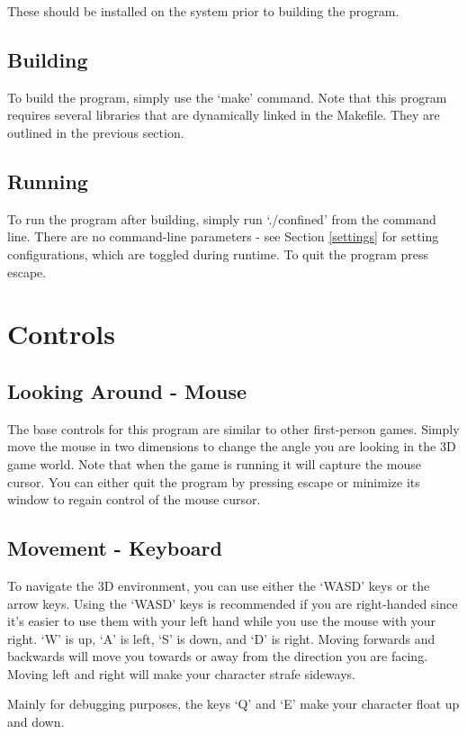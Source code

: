 \documentclass{book}
\begin{document}
      These should be installed on the system prior to building the program.

    \subsection{Building}
      To build the program, simply use the `make' command.
      Note that this program requires several libraries that are dynamically linked in the Makefile. They are outlined in the previous section.

    \subsection{Running}
      To run the program after building, simply run `./confined' from the command line.
      There are no command-line parameters - see Section \ref{settings} for setting configurations, which are toggled during runtime.
      To quit the program press escape.

  \section{Controls}
    \subsection{Looking Around - Mouse}
      The base controls for this program are similar to other first-person games.
      Simply move the mouse in two dimensions to change the angle you are looking in the 3D game world.
      Note that when the game is running it will capture the mouse cursor. You can either quit the program by pressing escape or minimize its window to regain control of the mouse cursor.

    \subsection{Movement - Keyboard}
      To navigate the 3D environment, you can use either the `WASD' keys or the arrow keys. Using the `WASD' keys is recommended if you are right-handed since it's easier to use them with your left hand while you use the mouse with your right. `W' is up, `A' is left, `S' is down, and `D' is right. Moving forwards and backwards will move you towards or away from the direction you are facing. Moving left and right will make your character strafe sideways.

      Mainly for debugging purposes, the keys `Q' and `E' make your character float up and down.
\end{document}
